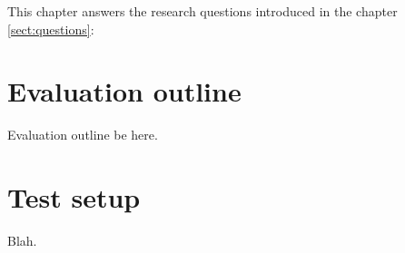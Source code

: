 
This chapter answers the research questions introduced in the chapter \ref{sect:questions}:



\section{Evaluation outline}

Evaluation outline be here.

\section{Test setup}

Blah.
